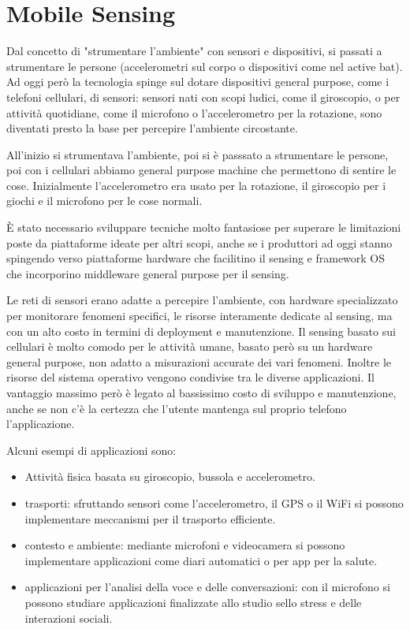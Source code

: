 \section{Mobile Sensing}
Dal concetto di "strumentare l'ambiente" con sensori e dispositivi, si passati a
strumentare le persone (accelerometri sul corpo o dispositivi come nel active
bat). Ad oggi però la tecnologia spinge sul dotare dispositivi general purpose,
come i telefoni cellulari, di sensori: sensori nati con scopi ludici, come il
giroscopio, o per attività quotidiane, come il microfono o l'accelerometro per
la rotazione, sono diventati presto la base per percepire l'ambiente
circostante.

All'inizio si strumentava l'ambiente, poi si è passsato a strumentare le persone,
poi con i cellulari abbiamo general purpose machine che permettono di sentire le
cose. Inizialmente l'accelerometro era usato per la rotazione, il giroscopio per
i giochi e il microfono per le cose normali.

È stato necessario sviluppare tecniche molto fantasiose per superare le
limitazioni poste da piattaforme ideate per altri scopi, anche se i produttori
ad oggi stanno spingendo verso piattaforme hardware che facilitino il sensing e
framework OS che incorporino middleware general purpose per il sensing.

Le reti di sensori erano adatte a percepire l'ambiente, con hardware
specializzato per monitorare fenomeni specifici, le risorse interamente dedicate
al sensing, ma con un alto costo in termini di deployment e manutenzione.
Il sensing basato sui cellulari è molto comodo per le attività umane, basato
però su un hardware general purpose, non adatto a misurazioni accurate dei vari
fenomeni. Inoltre le risorse del sistema operativo vengono condivise tra le
diverse applicazioni. Il vantaggio massimo però è legato al bassissimo costo di
sviluppo e manutenzione, anche se non c'è la certezza che l'utente mantenga sul
proprio telefono l'applicazione.

Alcuni esempi di applicazioni sono:
\begin{itemize}
\item Attività fisica basata su giroscopio, bussola e accelerometro.
\item trasporti: sfruttando sensori come l'accelerometro, il GPS o il WiFi si
possono implementare meccanismi per il trasporto efficiente.
\item contesto e ambiente: mediante microfoni e videocamera si possono
implementare applicazioni come diari automatici o per app per la salute.
\item applicazioni per l'analisi della voce e delle conversazioni: con il
microfono si possono studiare applicazioni finalizzate allo studio sello stress
e delle interazioni sociali.
\end{itemize}

